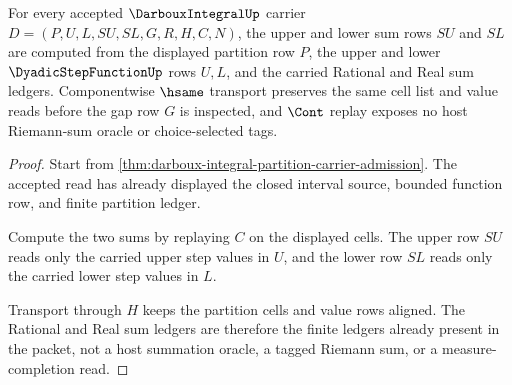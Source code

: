 \begin{theorem}
\label{thm:darboux-integral-upper-lower-sum-ledger}
For every accepted $\DarbouxIntegralUp$ carrier $D=(P,U,L,SU,SL,G,R,H,C,N)$, the upper and lower sum rows $SU$ and $SL$ are computed from the displayed partition row $P$, the upper and lower $\DyadicStepFunctionUp$ rows $U,L$, and the carried Rational and Real sum ledgers. Componentwise $\hsame$ transport preserves the same cell list and value reads before the gap row $G$ is inspected, and $\Cont$ replay exposes no host Riemann-sum oracle or choice-selected tags.
\end{theorem}
\begin{proof}
Start from \autoref{thm:darboux-integral-partition-carrier-admission}. The accepted read has already displayed the closed interval source, bounded function row, and finite partition ledger.

Compute the two sums by replaying $C$ on the displayed cells. The upper row $SU$ reads only the carried upper step values in $U$, and the lower row $SL$ reads only the carried lower step values in $L$.

Transport through $H$ keeps the partition cells and value rows aligned. The Rational and Real sum ledgers are therefore the finite ledgers already present in the packet, not a host summation oracle, a tagged Riemann sum, or a measure-completion read.
\end{proof}

